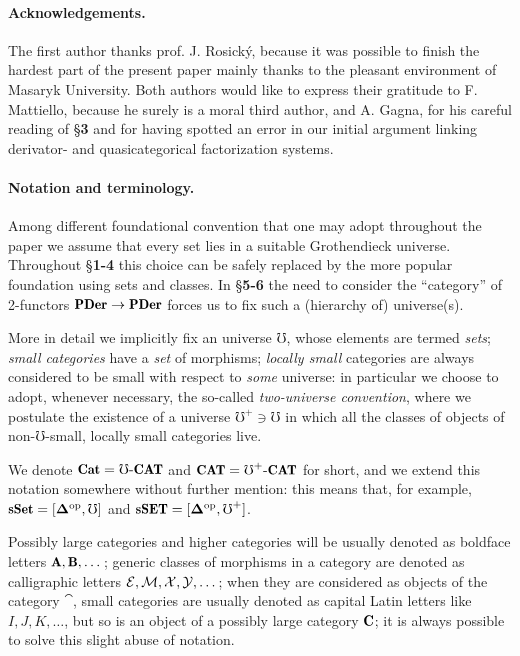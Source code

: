 \paragraph{\bf Acknowledgements.} The first author thanks prof\@. J\@. Rosick\'y, because it was possible to finish the hardest part of the present paper mainly thanks to the pleasant environment of Masaryk University. 
Both authors would like to express their gratitude to F\@. Mattiello, because he surely is a moral third author, and A\@. Gagna, for his careful reading of §\textbf{3} and for having spotted an error in our initial argument linking derivator- and quasicategorical factorization systems.

\medskip
\paragraph*{\bf Notation and terminology.}
Among different foundational convention that one may adopt throughout the paper we assume that every set lies in a suitable Grothendieck universe. Throughout §\textbf{1-4} this choice can be safely replaced by the more popular foundation using sets and classes. In §\textbf{5-6} the need to consider the ``category'' of 2-functors $\PDer \to \PDer$ forces us to fix such a (hierarchy of) universe(s).

More in detail we implicitly fix an universe $\mho$, whose elements are termed \emph{sets}; \emph{small categories} have a \emph{set} of morphisms; \emph{locally small} categories are always considered to be small with respect to \emph{some} universe: in particular we choose to adopt, whenever necessary, the so\hyp{}called \emph{two\hyp{}universe convention}, where we postulate the existence of a universe $\mho^+\ni \mho$ in which all the classes of objects of non\hyp{}$\mho$\hyp{}small, locally small categories live. 

We denote $\cat = \mho\text{-}\Cat$ and $\CAT = \mho^+\text{-}\Cat$ for short, and we extend this notation somewhere without further mention: this means that, for example, $\cate{sSet} = [\bDelta^\opp,\mho]$ and $\cate{sSET} = [\bDelta^\opp, \mho^+]$.

Possibly large categories and higher categories will be usually denoted as boldface letters $\A,\cate{B},\dots$; generic classes of morphisms in a category are denoted as calligraphic letters $\mathcal{E}, \mathcal{M}, \mathcal{X},\mathcal{Y},\dots$; when they are considered as objects of the category $\cat$, small categories are usually denoted as capital Latin letters like $I,J,K,\dots$, but so is an object of a possibly large category $\C$; it is always possible to solve this slight abuse of notation.

